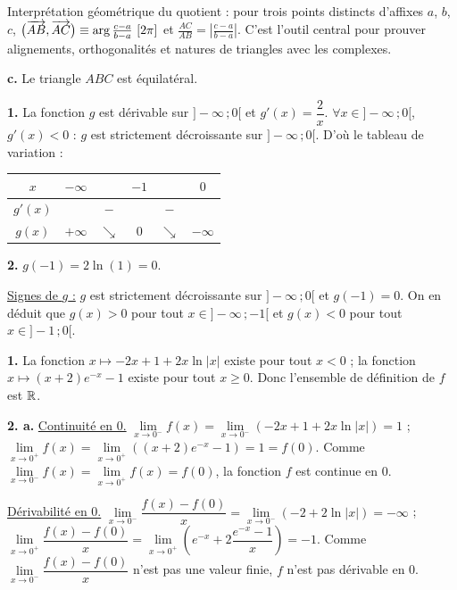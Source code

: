 \documentclass[11pt]{article}
\begin{document}
\begin{rappel}
Interprétation géométrique du quotient : pour trois points distincts
d'affixes $a$, $b$, $c$,
$\big(\overrightarrow{AB}, \overrightarrow{AC}\big) \equiv \arg\frac{c - a}{b - a}\ [2\pi]$ et
$\frac{AC}{AB} = \left|\frac{c - a}{b - a}\right|$. C'est l'outil
central pour prouver alignements, orthogonalités et natures de
triangles avec les complexes.
\end{rappel}

\textbf{c.} Le triangle $ABC$ est équilatéral.

\prob{}

\textbf{1.} La fonction $g$ est dérivable sur $]-\infty\,;0[$ et $g'(x) = \dfrac{2}{x}$. $\forall x \in ]-\infty\,;0[$, $g'(x) < 0$ : $g$ est strictement décroissante sur $]-\infty\,;0[$. D'où le tableau de variation :
\begin{center}\renewcommand{\arraystretch}{1.4}
\begin{tabular}{|c|ccccc|}
\hline
$x$ & $-\infty$ & & $-1$ & & $0$ \\
\hline
$g'(x)$ & & $-$ & & $-$ & \\
\hline
$g(x)$ & $+\infty$ & $\searrow$ & $0$ & $\searrow$ & $-\infty$ \\
\hline
\end{tabular}
\end{center}

\textbf{2.} $g(-1) = 2\ln(1) = 0$.

\underline{Signes de $g$ :} $g$ est strictement décroissante sur $]-\infty\,;0[$ et $g(-1) = 0$. On en déduit que $g(x) > 0$ pour tout $x \in ]-\infty\,;-1[$ et $g(x) < 0$ pour tout $x \in ]-1\,;0[$.

\textbf{1.} La fonction $x \mapsto -2x + 1 + 2x\ln|x|$ existe pour tout $x < 0$ ; la fonction $x \mapsto (x + 2)e^{-x} - 1$ existe pour tout $x \ge 0$. Donc l'ensemble de définition de $f$ est $\mathbb{R}$.

\textbf{2. a.} \underline{Continuité en 0.} $\lim\limits_{x\to 0^-} f(x) = \lim\limits_{x\to 0^-}(-2x + 1 + 2x\ln|x|) = 1$ ; $\lim\limits_{x\to 0^+} f(x) = \lim\limits_{x\to 0^+}((x+2)e^{-x} - 1) = 1 = f(0)$. Comme $\lim\limits_{x\to 0^-} f(x) = \lim\limits_{x\to 0^+} f(x) = f(0)$, la fonction $f$ est continue en 0.

\underline{Dérivabilité en 0.} $\lim\limits_{x\to 0^-}\dfrac{f(x) - f(0)}{x} = \lim\limits_{x\to 0^-}(-2 + 2\ln|x|) = -\infty$ ; $\lim\limits_{x\to 0^+}\dfrac{f(x) - f(0)}{x} = \lim\limits_{x\to 0^+}\left(e^{-x} + 2\dfrac{e^{-x} - 1}{x}\right) = -1$. Comme $\lim\limits_{x\to 0^-}\dfrac{f(x) - f(0)}{x}$ n'est pas une valeur finie, $f$ n'est pas dérivable en 0.
\end{document}
